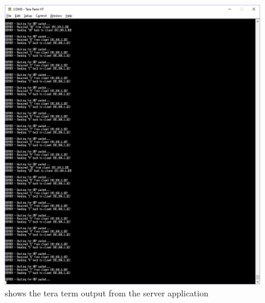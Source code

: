 \documentclass[a4paper,12pt]{scrartcl}
\begin{document}
{{{\begin{figure}
					\includegraphics[width=\textwidth]{Server}
					\caption{shows the tera term output from the server application}
					\label{img:ex1-server}
				\end{figure}
			}
}}
\end{document}
